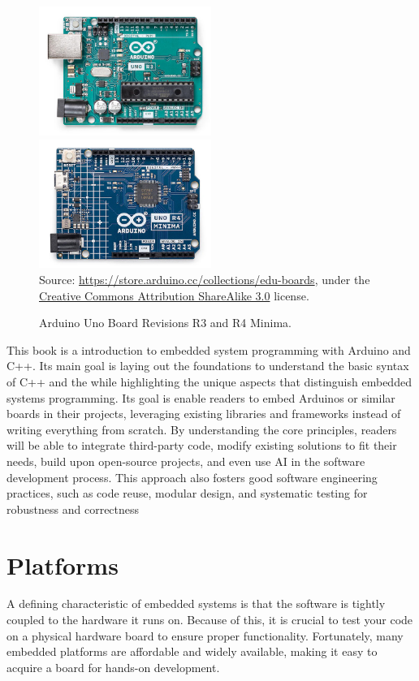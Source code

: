 \begin{figure}[b]
    \includegraphics[width=0.5\textwidth]{img/arduino_uno_rev3}%
    \includegraphics[width=0.5\textwidth]{img/arduino_uno_rev4}%
    \\ \scriptsize
    Source: \url{https://store.arduino.cc/collections/edu-boards}, under the \href{https://creativecommons.org/licenses/by-sa/3.0/legalcode}{Creative Commons Attribution ShareAlike 3.0} license.
    \caption{Arduino Uno Board Revisions R3 and R4 Minima.}
    \label{fig:arduino_uno}
\end{figure}

This book is a introduction to embedded system programming with Arduino and C++.
Its main goal is laying out the foundations to understand the basic syntax of C++ and the while highlighting the unique aspects that distinguish embedded systems programming.
Its goal is enable readers to embed Arduinos or similar boards in their projects, leveraging existing libraries and frameworks instead of writing everything from scratch.
By understanding the core principles, readers will be able to integrate third-party code, modify existing solutions to fit their needs, build upon open-source projects, and even use AI in the software development process.
This approach also fosters good software engineering practices, such as code reuse, modular design, and systematic testing for robustness and correctness


\section{Platforms}
A defining characteristic of embedded systems is that the software is tightly coupled to the hardware it runs on.
Because of this, it is crucial to test your code on a physical hardware board to ensure proper functionality. Fortunately, many embedded platforms are affordable and widely available, making it easy to acquire a board for hands-on development.

